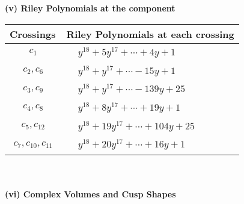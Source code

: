 \documentclass[1p]{elsarticle_modified}
\theoremstyle{definition}
\begin{document}
\newpage\renewcommand{\arraystretch}{1}
\flushleft \textbf{(v) Riley Polynomials at the component}\newline \\
\begin{tabular}{m{50pt}|m{274pt}}
Crossings & \hspace{64pt}Riley Polynomials at each crossing \\
\hline $$\begin{aligned}c_{1}\end{aligned}$$&$\begin{aligned}
&y^{18}+5 y^{17}+\cdots+4 y+1
\end{aligned}$\\
\hline $$\begin{aligned}c_{2},c_{6}\end{aligned}$$&$\begin{aligned}
&y^{18}+y^{17}+\cdots-15 y+1
\end{aligned}$\\
\hline $$\begin{aligned}c_{3},c_{9}\end{aligned}$$&$\begin{aligned}
&y^{18}+y^{17}+\cdots-139 y+25
\end{aligned}$\\
\hline $$\begin{aligned}c_{4},c_{8}\end{aligned}$$&$\begin{aligned}
&y^{18}+8 y^{17}+\cdots+19 y+1
\end{aligned}$\\
\hline $$\begin{aligned}c_{5},c_{12}\end{aligned}$$&$\begin{aligned}
&y^{18}+19 y^{17}+\cdots+104 y+25
\end{aligned}$\\
\hline $$\begin{aligned}c_{7},c_{10},c_{11}\end{aligned}$$&$\begin{aligned}
&y^{18}+20 y^{17}+\cdots+16 y+1
\end{aligned}$\\
\hline
\end{tabular}\\~\\
\newpage\flushleft \textbf{(vi) Complex Volumes and Cusp Shapes}
\end{document}
